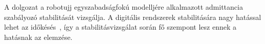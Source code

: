 A dolgozat a robotujj egyszabadságfokú modelljére alkalmazott admittancia szabályozó stabilitását vizsgálja.
A digitális rendszerek stabilitására nagy hatással lehet az időkésés~\cite{stepan1989retarded,stepan2001vibrations}, így a 
stabilitásvizsgálat során fő szempont lesz ennek a hatásnak az elemzése.


    
    
